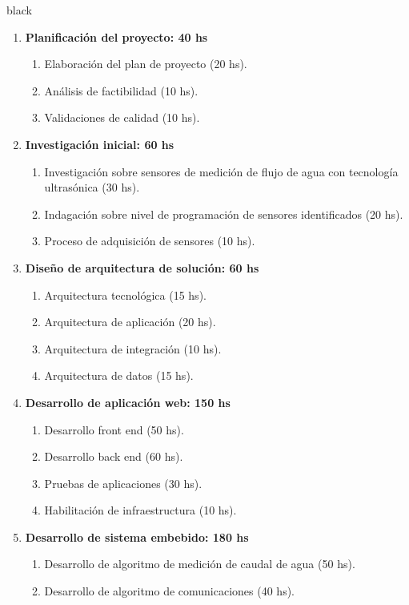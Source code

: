 \documentclass[
11pt, %
codirector, %
]{charter}
\begin{document}
\begin{consigna}{black}

\begin{enumerate}
\item \textbf{Planificación del proyecto: 40 hs}
	\begin{enumerate}
	\item Elaboración del plan de proyecto (20 hs).
	\item Análisis de factibilidad (10 hs).
	\item Validaciones de calidad (10 hs).
	\end{enumerate}
\item \textbf{Investigación inicial: 60 hs}
	\begin{enumerate}
	\item Investigación sobre sensores de medición de flujo de agua con tecnología ultrasónica (30 hs).
	\item Indagación sobre nivel de programación de sensores identificados (20 hs).
	\item Proceso de adquisición de sensores (10 hs).
	\end{enumerate}
\item \textbf{Diseño de arquitectura de solución: 60 hs}
	\begin{enumerate}
	\item Arquitectura tecnológica (15 hs).
	\item Arquitectura de aplicación (20 hs).
	\item Arquitectura de integración (10 hs).
	\item Arquitectura de datos (15 hs).
	\end{enumerate}
\item \textbf{Desarrollo de aplicación web: 150 hs}
	\begin{enumerate}
	\item Desarrollo front end (50 hs).
	\item Desarrollo back end (60 hs).
	\item Pruebas de aplicaciones (30 hs).
	\item Habilitación de infraestructura (10 hs).
	\end{enumerate}
\item \textbf{Desarrollo de sistema embebido: 180 hs}
	\begin{enumerate}
	\item Desarrollo de algoritmo de medición de caudal de agua (50 hs).
	\item Desarrollo de algoritmo de comunicaciones (40 hs).

\end{enumerate}
\end{enumerate}
\end{consigna}
\end{document}
